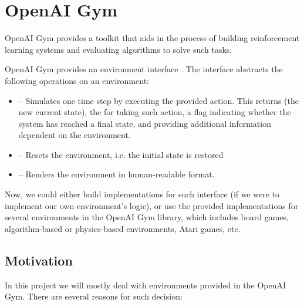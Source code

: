 \section{OpenAI Gym}
OpenAI Gym \citep{1606.01540} provides a toolkit that aids in the process of building reinforcement learning systems and evaluating algorithms to solve such tasks.

OpenAI Gym provides an environment interface . The interface abstracts the following operations on an environment:

\begin{itemize}
	\item {} -- Simulates one time step by executing the provided action. This returns  (the new current state), the  for taking such action, a flag  indicating whether the system has reached a final state, and  providing additional information dependent on the environment.
	\item {} -- Resets the environment, i.e. the initial state is restored
	\item {} -- Renders the environment in human-readable format.
\end{itemize}

Now, we could either build implementations for such interface (if we were to implement our own environment's logic), or use the provided implementations for several environments in the OpenAI Gym library, which includes board games, algorithm-based or physics-based environments, Atari games, etc.

\subsection{Motivation}
In this project we will mostly deal with environments provided in the OpenAI Gym. There are several reasons for such decision:

